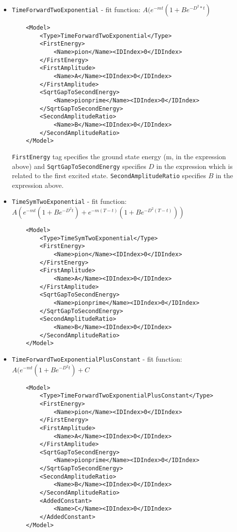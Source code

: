 \documentclass[12pt]{article}
\newcommand{\vb}{\texttt}
\begin{document}
\begin{itemize}
\item \vb{TimeForwardTwoExponential} - fit function: $A(e^{-mt}(1 + B e^{-D^2*t})$ 
\begin{verbatim}
    <Model>
        <Type>TimeForwardTwoExponential</Type>
        <FirstEnergy>
            <Name>pion</Name><IDIndex>0</IDIndex>
        </FirstEnergy>
        <FirstAmplitude>
            <Name>A</Name><IDIndex>0</IDIndex>
        </FirstAmplitude>
        <SqrtGapToSecondEnergy>
            <Name>pionprime</Name><IDIndex>0</IDIndex>
        </SqrtGapToSecondEnergy>
        <SecondAmplitudeRatio>
            <Name>B</Name><IDIndex>0</IDIndex>
        </SecondAmplitudeRatio>
    </Model>
\end{verbatim}

\vb{FirstEnergy} tag specifies the ground state energy (m, in the expression above) and \vb{SqrtGapToSecondEnergy} specifies $D$ in the expression which is  related to the first excited state.
\vb{SecondAmplitudeRatio} specifies $B$ in the expression above.

\item \vb{TimeSymTwoExponential} - fit function: $A(e^{-mt}(1 + B e^{-D^2t}) + e^{-m(T-t)}(1 + B e^{-D^2(T-t)}))$
\begin{verbatim}
    <Model>
        <Type>TimeSymTwoExponential</Type>
        <FirstEnergy>
            <Name>pion</Name><IDIndex>0</IDIndex>
        </FirstEnergy>
        <FirstAmplitude>
            <Name>A</Name><IDIndex>0</IDIndex>
        </FirstAmplitude>
        <SqrtGapToSecondEnergy>
            <Name>pionprime</Name><IDIndex>0</IDIndex>
        </SqrtGapToSecondEnergy>
        <SecondAmplitudeRatio>
            <Name>B</Name><IDIndex>0</IDIndex>
        </SecondAmplitudeRatio>
    </Model>
\end{verbatim}

\item \vb{TimeForwardTwoExponentialPlusConstant} - fit function: $A(e^{-mt}(1 + B e^{-D^2t}) + C$
\begin{verbatim}
    <Model>
        <Type>TimeForwardTwoExponentialPlusConstant</Type>
        <FirstEnergy>
            <Name>pion</Name><IDIndex>0</IDIndex>
        </FirstEnergy>
        <FirstAmplitude>
            <Name>A</Name><IDIndex>0</IDIndex>
        </FirstAmplitude>
        <SqrtGapToSecondEnergy>
            <Name>pionprime</Name><IDIndex>0</IDIndex>
        </SqrtGapToSecondEnergy>
        <SecondAmplitudeRatio>
            <Name>B</Name><IDIndex>0</IDIndex>
        </SecondAmplitudeRatio>
        <AddedConstant>
            <Name>C</Name><IDIndex>0</IDIndex>
        </AddedConstant>
    </Model>
\end{verbatim}


\end{itemize}
\end{document}
